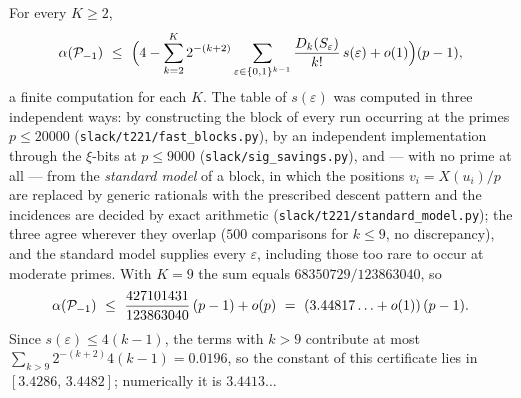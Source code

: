 \begin{corollary}\label{cor:blockconst}
For every $K\ge2$,
\[
 \alpha(\Pset_{-1})\ \le\ \Bigl(4-\sum_{k=2}^{K}2^{-(k+2)}\sum_{\varepsilon\in\{0,1\}^{k-1}}\frac{D_k(S_\varepsilon)}{k!}\,s(\varepsilon)+o(1)\Bigr)(p-1),
\]
a finite computation for each $K$.  The table of $s(\varepsilon)$ was computed in three independent ways: by constructing the block of every run occurring at the primes
$p\le20000$ (\texttt{slack/t221/fast\_blocks.py}), by an independent implementation through the $\xi$-bits at $p\le9000$
(\texttt{slack/sig\_savings.py}), and --- with no prime at all --- from the \emph{standard model} of a block, in which the positions
$v_i=X(u_i)/p$ are replaced by generic rationals with the prescribed descent pattern and the incidences are decided by exact arithmetic
(\texttt{slack/t221/standard\_model.py}); the three agree wherever they overlap ($500$ comparisons for $k\le9$, no discrepancy), and the
standard model supplies every $\varepsilon$, including those too rare to occur at moderate primes.  With $K=9$ the sum equals
$68350729/123863040$, so
\[
 \alpha(\Pset_{-1})\ \le\ \frac{427101431}{123863040}\,(p-1)+o(p)\ =\ (3.44817\ldots+o(1))\,(p-1).
\]
Since $s(\varepsilon)\le4(k-1)$, the terms with $k>9$ contribute at most $\sum_{k>9}2^{-(k+2)}4(k-1)=0.0196$, so the constant of this
certificate lies in $[3.4286,\,3.4482]$; numerically it is $3.4413\ldots$
\end{corollary}

